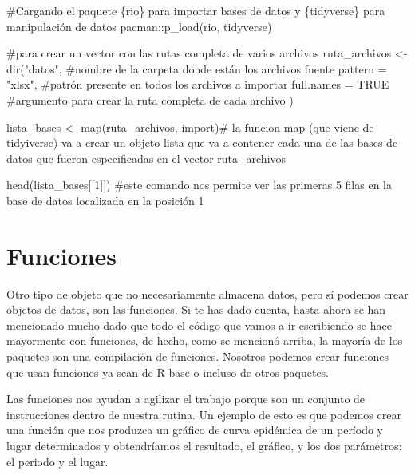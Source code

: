 \documentclass[
  letterpaper,
  DIV=11,
  numbers=noendperiod]{scrreprt}
\newenvironment{Shaded}{\begin{snugshade}}{\end{snugshade}}
\newcommand{\AttributeTok}[1]{\textcolor[rgb]{0.40,0.45,0.13}{#1}}
\newcommand{\CommentTok}[1]{\textcolor[rgb]{0.37,0.37,0.37}{#1}}
\newcommand{\ConstantTok}[1]{\textcolor[rgb]{0.56,0.35,0.01}{#1}}
\newcommand{\DecValTok}[1]{\textcolor[rgb]{0.68,0.00,0.00}{#1}}
\newcommand{\FunctionTok}[1]{\textcolor[rgb]{0.28,0.35,0.67}{#1}}
\newcommand{\NormalTok}[1]{\textcolor[rgb]{0.00,0.23,0.31}{#1}}
\newcommand{\OtherTok}[1]{\textcolor[rgb]{0.00,0.23,0.31}{#1}}
\newcommand{\SpecialCharTok}[1]{\textcolor[rgb]{0.37,0.37,0.37}{#1}}
\newcommand{\StringTok}[1]{\textcolor[rgb]{0.13,0.47,0.30}{#1}}
\begin{document}
\begin{Shaded}
\begin{Highlighting}[]
\CommentTok{\#Cargando el paquete \{rio\} para importar bases de datos y \{tidyverse\} para manipulación de datos}
\NormalTok{pacman}\SpecialCharTok{::}\FunctionTok{p\_load}\NormalTok{(rio,      }
\NormalTok{               tidyverse)  }

\CommentTok{\#para crear un vector con las rutas completa de varios archivos}
\NormalTok{ruta\_archivos }\OtherTok{\textless{}{-}} \FunctionTok{dir}\NormalTok{(}\StringTok{"datos"}\NormalTok{, }\CommentTok{\#nombre de la carpeta donde están los archivos fuente}
                     \AttributeTok{pattern =} \StringTok{"xlsx"}\NormalTok{, }\CommentTok{\#patrón presente en todos los archivos a importar}
                     \AttributeTok{full.names =} \ConstantTok{TRUE} \CommentTok{\#argumento para crear la ruta completa de cada archivo}
\NormalTok{                     )}

\NormalTok{lista\_bases }\OtherTok{\textless{}{-}} \FunctionTok{map}\NormalTok{(ruta\_archivos, import)}\CommentTok{\# la funcion map (que viene de tidyiverse) va a crear un objeto lista que va a contener cada una de las bases de datos que fueron especificadas en el vector ruta\_archivos}

\FunctionTok{head}\NormalTok{(lista\_bases[[}\DecValTok{1}\NormalTok{]]) }\CommentTok{\#este comando nos permite ver las primeras 5 filas en la base de datos localizada en la posición 1}
\end{Highlighting}
\end{Shaded}

\section{Funciones}\label{funciones}

Otro tipo de objeto que no necesariamente almacena datos, pero sí
podemos crear objetos de datos, son las funciones. Si te has dado
cuenta, hasta ahora se han mencionado mucho dado que todo el código que
vamos a ir escribiendo se hace mayormente con funciones, de hecho, como
se mencionó arriba, la mayoría de los paquetes son una compilación de
funciones. Nosotros podemos crear funciones que usan funciones ya sean
de R base o incluso de otros paquetes.

Las funciones nos ayudan a agilizar el trabajo porque son un conjunto de
instrucciones dentro de nuestra rutina. Un ejemplo de esto es que
podemos crear una función que nos produzca un gráfico de curva epidémica
de un período y lugar determinados y obtendríamos el resultado, el
gráfico, y los dos parámetros: el periodo y el lugar.
\end{document}
